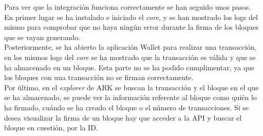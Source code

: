 Para ver que la integración funciona correctamente se han seguido unos pasos.\\ 

En primer lugar se ha instalado e iniciado el \textit{core}, y se han mostrado los logs del mismo para comprobar que no haya ningún error durante la firma de los bloques que se vayan generando.\\

Posteriormente, se ha abierto la aplicación Wallet para realizar una transacción, en los mismos logs del \textit{core} se ha mostrado que la transacción es válida y que se ha almacenado en un bloque. Esta parte no se ha podido cumplimentar, ya que los bloques con una transacción no se firman correctamente.\\

Por último, en el \textit{explorer} de ARK se buscan la transacción y el bloque en el que se ha almacenado, se puede ver la información referente al bloque como quién lo ha firmado, cuándo se ha creado el bloque o el número de transacciones. Si se desea visualizar la firma de un bloque  hay que acceder a la API y buscar el bloque en cuestión, por la ID.
